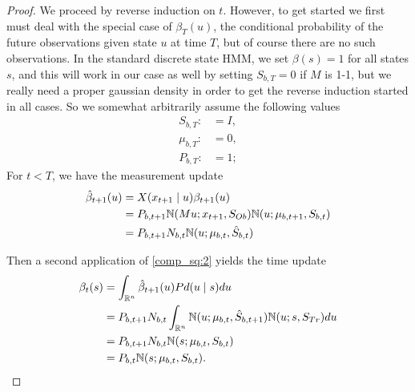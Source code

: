 \documentclass[12pt,leqno]{article}
\begin{document}
\begin{proof}
We proceed by reverse induction on $t$. However, to get started we first must  deal with
the special case of $\beta_{T}(u)$, the conditional probability of the future observations given
state $u$ at time $T$, but of course there are no such observations.  In the standard discrete
state HMM, we set $\beta(s) = 1$ for all states $s$, and this will work in our case as well by
setting $S_{b,T} = 0$ if $M$ is 1-1, but we really need a proper gaussian 
density in order to get the reverse induction started in all cases.  So we somewhat arbitrarily
assume the following values
\begin{align*}
  S_{b,T} :&= I,\\
  \mu_{b,T} :&= 0,\\
  P_{b,T} :&= 1;
\end{align*}
  For $t <  T$, we have the measurement update 
  \begin{align*}
    \hat{\beta}_{t+1}(u) &= X(x_{t+1}\mid u)\beta_{t+1}(u)\\
    &= P_{b,t+1}{\mathbb N}(Mu;x_{t+1},S_{Ob}){\mathbb N}(u;\mu_{b,t+1},S_{b,t})\\
    &= P_{b,t+1}N_{b,t}{\mathbb N}(u;\mu_{b,t},\hat{S}_{b,t})
  \end{align*}

  Then a second application of \eqref{comp_sq:2} yields the time update
  \begin{align*}
    \beta_t(s) &= \int_{{\mathbb R}^n}\hat{\beta}_{t+1}(u)Pd(u\mid s)du \\
    &= P_{b,t+1}N_{b,t}\int_{{\mathbb R}^n}{\mathbb N}(u;\mu_{b,t},\hat{S}_{b,t+1}){\mathbb N}(u;s,S_{Tr})du\\
    &=P_{b,t+1}N_{b,t}{\mathbb N}(s;\mu_{b,t},S_{b,t})\\
    &=P_{b,t}{\mathbb N}(s;\mu_{b,t},S_{b,t}).
  \end{align*}
\end{proof}
\end{document}
